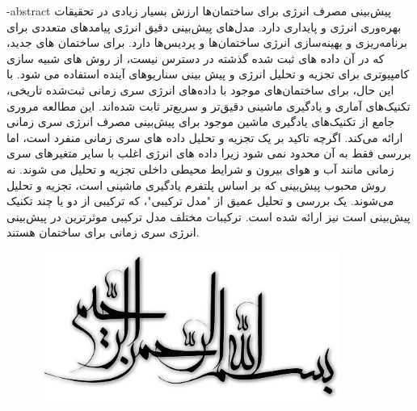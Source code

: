 \department{}

\fa-abstract{
    پیش‌بینی مصرف انرژی برای ساختمان‌ها ارزش بسیار زیادی در تحقیقات بهره‌وری انرژی و پایداری دارد. مدل‌های پیش‌بینی دقیق انرژی پیامدهای متعددی برای برنامه‌ریزی و بهینه‌سازی انرژی ساختمان‌ها و پردیس‌ها دارد. برای ساختمان های جدید، که در آن داده های ثبت شده گذشته در دسترس نیست، از روش های شبیه سازی کامپیوتری برای تجزیه و تحلیل انرژی و پیش بینی سناریوهای آینده استفاده می شود. 
    با این حال، برای ساختمان‌های موجود با داده‌های انرژی سری زمانی ثبت‌شده تاریخی، تکنیک‌های آماری و یادگیری ماشینی دقیق‌تر و سریع‌تر ثابت شده‌اند. این مطالعه مروری جامع از تکنیک‌های یادگیری ماشین موجود برای پیش‌بینی مصرف انرژی سری زمانی ارائه می‌کند.
     اگرچه تاکید بر یک تجزیه و تحلیل داده های سری زمانی منفرد است، اما بررسی فقط به آن محدود نمی شود زیرا داده های انرژی اغلب با سایر متغیرهای سری زمانی مانند آب و هوای بیرون و شرایط محیطی داخلی تجزیه و تحلیل می شوند. 
     نه روش محبوب پیش‌بینی که بر اساس پلتفرم یادگیری ماشینی است، تجزیه و تحلیل می‌شوند. یک بررسی و تحلیل عمیق از "مدل ترکیبی"، که ترکیبی از دو یا چند تکنیک پیش‌بینی است نیز ارائه شده است. ترکیبات مختلف مدل ترکیبی موثرترین در پیش‌بینی انرژی سری زمانی برای ساختمان هستند.
}




\AUTtitle
\vspace*{7cm}
\thispagestyle{empty}
\begin{center}
\includegraphics[height=5cm,width=12cm]{besm}
\end{center}